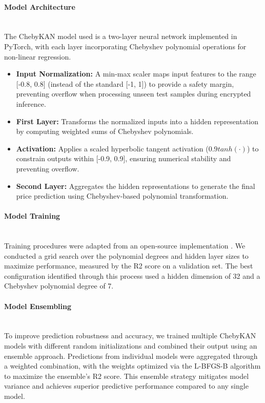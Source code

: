 \documentclass[article]{iacrtrans}
\begin{document}
\paragraph{Model Architecture}\mbox{}\\

The ChebyKAN model used is a two-layer neural network implemented in PyTorch, with each layer incorporating Chebyshev polynomial operations for non-linear regression.

\begin{itemize}
    \item \textbf{Input Normalization:} A min-max scaler maps input features to the range [-0.8, 0.8] (instead of the standard [-1, 1]) to provide a safety margin, preventing overflow when processing unseen test samples during encrypted inference.
    \item \textbf{First Layer:} Transforms the normalized inputs into a hidden representation by computing weighted sums of Chebyshev polynomials.
    \item \textbf{Activation:} Applies a scaled hyperbolic tangent activation ($0.9tanh⁡(⋅)$) to constrain outputs within [-0.9, 0.9], ensuring numerical stability and preventing overflow.
    \item \textbf{Second Layer:} Aggregates the hidden representations to generate the final price prediction using Chebyshev-based polynomial transformation.
\end{itemize}

\paragraph{Model Training}\mbox{}\\

Training procedures were adapted from an open-source implementation \cite{ChebyKAN}. We conducted a grid search over the polynomial degrees and hidden layer sizes to maximize performance, measured by the R2 score on a validation set. The best configuration identified through this process used a hidden dimension of 32 and a Chebyshev polynomial degree of 7.

\paragraph{Model Ensembling}\mbox{}\\

To improve prediction robustness and accuracy, we trained multiple ChebyKAN models with different random initializations and combined their output using an ensemble approach. Predictions from individual models were aggregated through a weighted combination, with the weights optimized via the L-BFGS-B algorithm to maximize the ensemble’s R2 score. This ensemble strategy mitigates model variance and achieves superior predictive performance compared to any single model.
\end{document}
